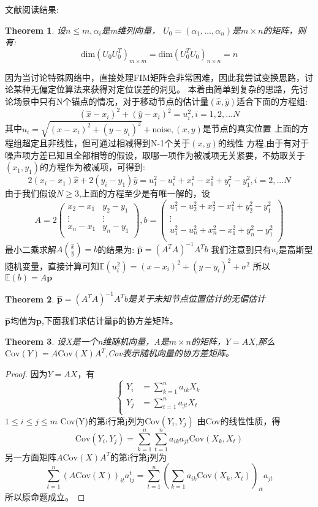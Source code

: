 \documentclass[12pt]{article}
\newtheorem{thm}{Theorem}[section]
\theoremstyle{remark}
\begin{document}
\title{\textbf{}} 

\author{}
\maketitle
\large
文献阅读结果:
\begin{thm}
设$n\le m,\alpha_i$是m维列向量，
$U_0=(\alpha_1,...,\alpha_n)$是$m\times n$的矩阵，则有:
\[
\text{dim}(U_0U_0^T)_{m\times m}=\text{dim}(U_0^TU_0)_{n\times n}=n
\]
\end{thm}
因为当讨论特殊网络中，直接处理FIM矩阵会非常困难，因此我尝试变换思路，讨论某种无偏定位算法来获得对定位误差的洞见。
本着由简单到复杂的思路，先讨论场景中只有N个锚点的情况，对于移动节点的估计量$(\hat{x},\hat{y})$适合下面的方程组:
\[
(\hat{x}-x_i)^2+(\hat{y}-x_i)^2=u_i^2,i=1,2,...N
\]
其中$u_i=\sqrt{(x-x_i)^2+(y-y_i)^2}+\text{noise},(x,y)$是节点的真实位置
上面的方程组超定且非线性，但可通过相减得到N-1个关于$(x,y)$的线性
方程,由于有对于噪声项方差已知且全部相等的假设，取哪一项作为被减项无关紧要，不妨取关于$(x_1,y_1)$的方程作为被减项，可得到:
\[
2(x_i-x_1)\hat{x}+2(y_i-y_1)\hat{y}=u_1^2-u_i^2+x_i^2-x_1^2+y_i^2-y_1^2,i=2,...N
\]
由于我们假设$N\geq 3$,上面的方程至少是有唯一解的，设
\[
A=2\left(
\begin{array}{cc}
x_2-x_1&y_2-y_1\\
\vdots&\vdots\\
x_n-x_1&y_n-y_1\\
\end{array}
\right),b=\left(
\begin{array}{c}
u_1^2-u_2^2+x_2^2-x_1^2+y_2^2-y_1^2\\
\vdots\\
u_1^2-u_n^2+x_n^2-x_1^2+y_n^2-y_1^2\\
\end{array}
\right)
\]
最小二乘求解$A\binom{\hat{x}}{\hat{y}}=b$的结果为:
$\bm{\hat{p}}=(A^TA)^{-1}A^Tb$
我们注意到只有$u_i$是高斯型随机变量，直接计算可知$\mathbb{E}(u_i^2)=(x-x_i)^2+(y-y_i)^2+\sigma^2$
所以$\mathbb{E}(b)=A\bm{p}$
\begin{thm}
$\bm{\hat{p}}=(A^TA)^{-1}A^Tb$是关于未知节点位置估计的无偏估计
\end{thm}
$\bm{\hat{p}}$均值为$\bm{p}$,下面我们求估计量$\bm{\hat{p}}$的协方差矩阵。
\begin{thm}
设X是一个n维随机向量，A是$m\times n$的矩阵，$Y=AX$,那么$\text{Cov}(Y)=A\text{Cov}(X)A^T$,Cov表示随机向量的协方差矩阵。
\end{thm}
\begin{proof}
因为$Y=AX$，有
\[
\begin{cases}
Y_i&=\sum_{k=1}^n a_{ik}X_k\\
Y_j&=\sum_{t=1}^n a_{jt}X_t\\
\end{cases}
\]
$1\leq i\leq j\leq m$
Cov(Y)的第i行第j列为$\text{Cov}(Y_i,Y_j)$
由Cov的线性性质，得
\[
\text{Cov}(Y_i,Y_j)=\sum_{k=1}^n\sum_{t=1}^n a_{ik}a_{jt}\text{Cov}(X_k,X_t)
\]
另一方面矩阵$A\text{Cov}(X)A^T$的第i行第j列为
\[
\sum_{t=1}^n(A\text{Cov}(X))_{it}a^t_{tj}
=\sum_{t=1}^n(\sum_{k=1}a_{ik}\text{Cov}(X_k,X_t))_{it}a_{jt}
\]
所以原命题成立。
\end{proof}
\end{document}

